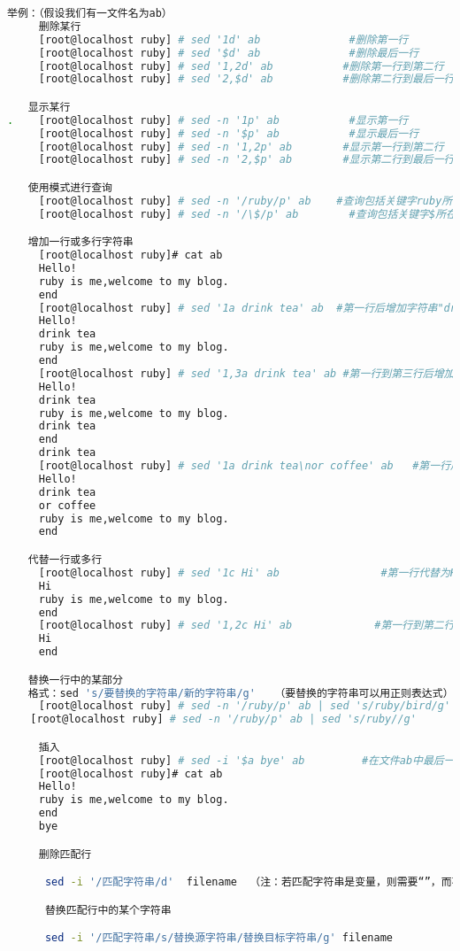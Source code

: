 \begin{lstlisting}[language=sh]
举例：（假设我们有一文件名为ab）
     删除某行
     [root@localhost ruby] # sed '1d' ab              #删除第一行 
     [root@localhost ruby] # sed '$d' ab              #删除最后一行
     [root@localhost ruby] # sed '1,2d' ab           #删除第一行到第二行
     [root@localhost ruby] # sed '2,$d' ab           #删除第二行到最后一行

　　显示某行
.    [root@localhost ruby] # sed -n '1p' ab           #显示第一行 
     [root@localhost ruby] # sed -n '$p' ab           #显示最后一行
     [root@localhost ruby] # sed -n '1,2p' ab        #显示第一行到第二行
     [root@localhost ruby] # sed -n '2,$p' ab        #显示第二行到最后一行

　　使用模式进行查询
     [root@localhost ruby] # sed -n '/ruby/p' ab    #查询包括关键字ruby所在所有行
     [root@localhost ruby] # sed -n '/\$/p' ab        #查询包括关键字$所在所有行，使用反斜线\屏蔽特殊含义

　　增加一行或多行字符串
     [root@localhost ruby]# cat ab
     Hello!
     ruby is me,welcome to my blog.
     end
     [root@localhost ruby] # sed '1a drink tea' ab  #第一行后增加字符串"drink tea"
     Hello!
     drink tea
     ruby is me,welcome to my blog. 
     end
     [root@localhost ruby] # sed '1,3a drink tea' ab #第一行到第三行后增加字符串"drink tea"
     Hello!
     drink tea
     ruby is me,welcome to my blog.
     drink tea
     end
     drink tea
     [root@localhost ruby] # sed '1a drink tea\nor coffee' ab   #第一行后增加多行，使用换行符\n
     Hello!
     drink tea
     or coffee
     ruby is me,welcome to my blog.
     end

　　代替一行或多行
     [root@localhost ruby] # sed '1c Hi' ab                #第一行代替为Hi
     Hi
     ruby is me,welcome to my blog.
     end
     [root@localhost ruby] # sed '1,2c Hi' ab             #第一行到第二行代替为Hi
     Hi
     end

　　替换一行中的某部分
　　格式：sed 's/要替换的字符串/新的字符串/g'   （要替换的字符串可以用正则表达式）
     [root@localhost ruby] # sed -n '/ruby/p' ab | sed 's/ruby/bird/g'    #替换ruby为bird
　  [root@localhost ruby] # sed -n '/ruby/p' ab | sed 's/ruby//g'        #删除ruby

     插入
     [root@localhost ruby] # sed -i '$a bye' ab         #在文件ab中最后一行直接输入"bye"
     [root@localhost ruby]# cat ab
     Hello!
     ruby is me,welcome to my blog.
     end
     bye

     删除匹配行

      sed -i '/匹配字符串/d'  filename  （注：若匹配字符串是变量，则需要“”，而不是‘’。记得好像是）

      替换匹配行中的某个字符串

      sed -i '/匹配字符串/s/替换源字符串/替换目标字符串/g' filename
\end{lstlisting}




